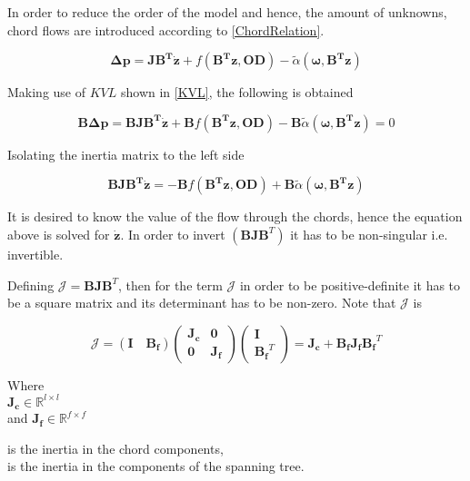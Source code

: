 In order to reduce the order of the model and hence, the amount of unknowns, chord flows are introduced according to \eqref{ChordRelation}. 

\begin{equation}
    \bm{\Delta p} =  \bm{J} \bm{B^T} \bm{\dot{z}} + f(\bm{B^T}\bm{z}, \bm{OD}) - \tilde{\alpha} (\bm{\omega},\bm{B^T}\bm{z})
  \label{ChordsModel}
\end{equation}

Making use of $KVL$ shown in \eqref{KVL}, the following is obtained

\begin{equation}
 \bm{B}\bm{\Delta p} = \bm{B} \bm{J} \bm{B^T} \bm{\dot{z}} + \bm{B} f(\bm{B^T}\bm{z}, \bm{OD}) - \bm{B}\tilde{\alpha} (\bm{\omega},\bm{B^T}\bm{z}) = 0 \label{model4lin}
 \end{equation}

Isolating the inertia matrix to the left side

\begin{equation}
  \bm{B} \bm{J} \bm{B^T} \bm{\dot{z}} = - \bm{B} f(\bm{B^T}\bm{z},\bm{OD}) + \bm{B}\tilde{\alpha} (\bm{\omega},\bm{B^T}\bm{z}) 
 \label{isolateZ}
 \end{equation}

It is desired to know the value of the flow through the chords, hence the equation above is solved 
for $\bm{\dot{z}}$. In order to invert $(\bm{B J} \bm{{B}}^T)$ it has to be non-singular i.e. invertible. 

Defining $\bm{\mathcal{J}} = \bm{B J} \bm{{B}}^T $, then for the term $\bm{\mathcal{J}}$ in order to be positive-definite it has to be a square matrix and its determinant has to be non-zero. Note that $\bm{\mathcal{J}}$ is

\begin{equation}
  \label{Jequation}
  \bm{\mathcal{J}} = (\bm{I \quad B_f}) 
  \begin{pmatrix}
    \bm{J_c}    &    \bm{0 }   \\
    \bm{0}       &   \bm{ J_f}
  \end{pmatrix}
  \begin{pmatrix}
    \bm{I}    \\
    \bm{{B_f}}^T
  \end{pmatrix}
  = \bm{J_c} + \bm{B_f J_f} \bm{{B_f}}^T
\end{equation}

\begin{minipage}[t]{0.20\textwidth}
Where\\
\hspace*{8mm} $\bm{J_c} \in \mathbb{R}^{l \times l}$  \\
and \hspace*{0.7mm} $\bm{J_f} \in \mathbb{R}^{f \times f} $ 
\end{minipage}
\begin{minipage}[t]{0.68\textwidth}
\vspace*{2mm}
\hspace*{4mm} is the inertia in the chord components,\\
\hspace*{4mm} is the inertia in the components of the spanning tree.
\end{minipage}

